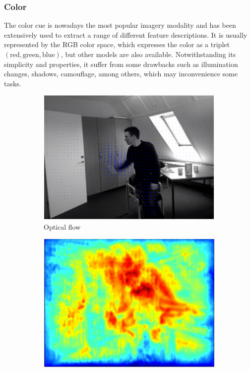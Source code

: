 \documentclass[10pt,twocolumn,letterpaper]{article}
\begin{document}
\subsubsection{Color}
\label{sssec:color}

The color cue is nowadays the most popular imagery modality and has been extensively used to extract a range of different feature descriptions. It is usually represented by the RGB color space, which expresses the color as a triplet $(\text{red}, \text{green}, \text{blue})$, but other models are also available. Notwithstanding its simplicity and properties, it suffer from some drawbacks such as illumination changes, shadows, camouflage, among others, which may inconvenience some tasks.

\begin{figure}
        \begin{subfigure}[b]{0.515\textwidth}
                \includegraphics[width=\textwidth]{opticalflow_final.eps}
                \caption{Optical flow}
                \label{fig:opticalflow}
        \end{subfigure}
        \begin{subfigure}[b]{0.5\textwidth}
                \includegraphics[width=\textwidth]{ramanan_final}

\end{subfigure}
\end{figure}
\end{document}
